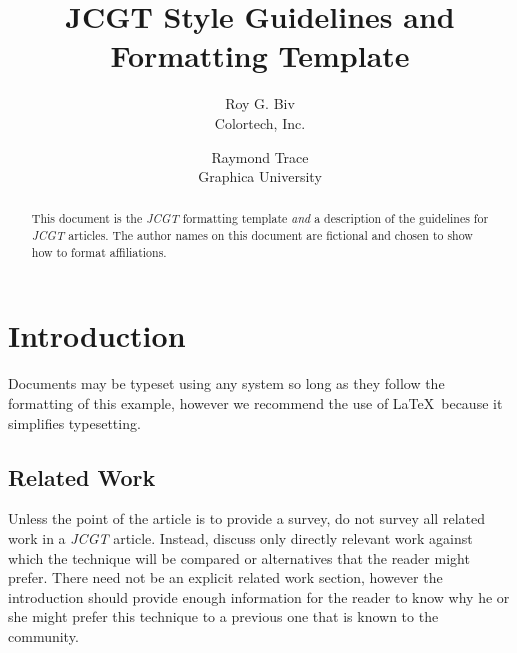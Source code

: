 \documentclass{jcgt}
\begin{document}
\title{JCGT Style Guidelines and\\Formatting Template}

\author
       {Roy G. Biv\\Colortech, Inc.
        \and Raymond Trace\\Graphica University
       }


\maketitle
\thispagestyle{firstpagestyle}

\begin{abstract}
\small
This document is the \textit{JCGT} formatting template \textit{and} a description of the guidelines
for  \textit{JCGT} articles.  The author names on this document are fictional and chosen to show
how to format affiliations.
\end{abstract}


\section{Introduction}
\label{sec:introduction}
Documents may be typeset using any system so long as they follow the formatting
of this example, however we recommend
the use of \LaTeX\ because it simplifies typesetting.

\subsection{Related Work}
\label{sec:relatedwork}

Unless the point of the article is to provide a survey, do not survey all related work in a \textit{JCGT} article. Instead, discuss only directly relevant work against which the technique will be compared or alternatives that the reader might prefer.  There need not be an explicit related work section, however the introduction should provide enough information for the reader to know why he or she might prefer this technique to a previous one that is known to the community.
\end{document}
